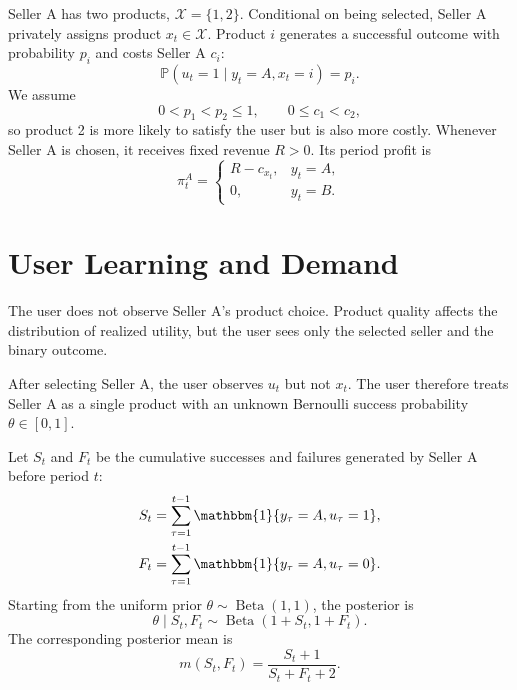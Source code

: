 \documentclass[opre]{informs3}
\newcommand{\Pb}{\mathbb{P}}
\newcommand{\Ind}[1]{\mathbbm{1}\{#1\}}
\newcommand{\Xscr}{\mathcal{X}}
\begin{document}
Seller A has two products, $\Xscr=\{1,2\}$. Conditional on being selected,
Seller A privately assigns product $x_t\in\Xscr$. Product $i$ generates a
successful outcome with probability $p_i$ and costs Seller A $c_i$:
\begin{equation}
    \Pb(u_t=1\mid y_t=A,x_t=i)=p_i.
    \label{eq:seller-a-success}
\end{equation}
We assume
\begin{equation}
    0<p_1<p_2\leq 1,\qquad 0\leq c_1<c_2,
    \label{eq:product-ordering}
\end{equation}
so product 2 is more likely to satisfy the user but is also more costly.
Whenever Seller A is chosen, it receives fixed revenue $R>0$. Its period profit
is
\begin{equation}
    \pi_t^A=
    \begin{cases}
        R-c_{x_t}, & y_t=A,\\
        0, & y_t=B.
    \end{cases}
    \label{eq:period-profit}
\end{equation}

\section{User Learning and Demand}

The user does not observe Seller A's product choice. Product quality affects the
distribution of realized utility, but the user sees only the selected seller
and the binary outcome.

\begin{assumption}
After selecting Seller A, the user observes $u_t$ but not $x_t$. The user
therefore treats Seller A as a single product with an unknown Bernoulli success
probability $\theta\in[0,1]$.
\end{assumption}

Let $S_t$ and $F_t$ be the cumulative successes and failures generated by
Seller A before period $t$:
\begin{align}
    S_t &= \sum_{\tau=1}^{t-1}\Ind{y_\tau=A,u_\tau=1},\\
    F_t &= \sum_{\tau=1}^{t-1}\Ind{y_\tau=A,u_\tau=0}.
\end{align}
Starting from the uniform prior
$\theta\sim\operatorname{Beta}(1,1)$, the posterior is
\begin{equation}
    \theta\mid S_t,F_t
    \sim
    \operatorname{Beta}(1+S_t,1+F_t).
    \label{eq:posterior}
\end{equation}
The corresponding posterior mean is
\begin{equation}
    m(S_t,F_t)=\frac{S_t+1}{S_t+F_t+2}.
    \label{eq:posterior-mean}
\end{equation}
\end{document}
